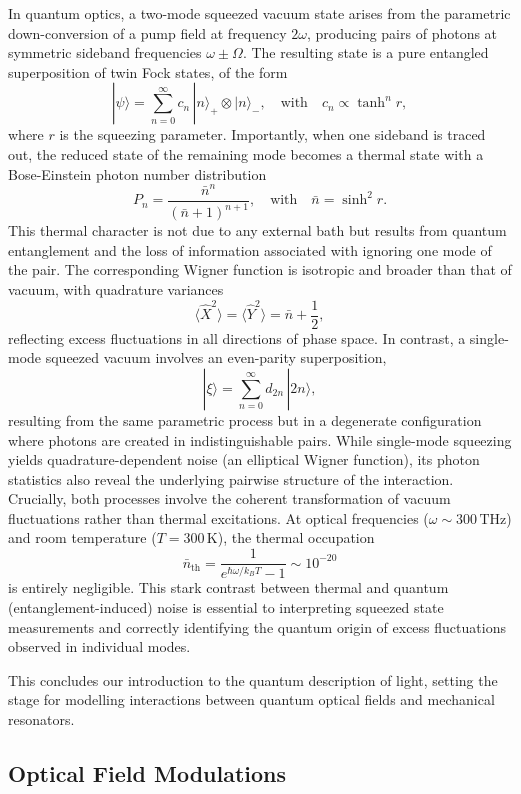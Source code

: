 In quantum optics, a two-mode squeezed vacuum state arises from the parametric down-conversion of a pump field at frequency \(2\omega\), producing pairs of photons at symmetric sideband frequencies \(\omega \pm \Omega\). The resulting state is a pure entangled superposition of twin Fock states, of the form
\[
|\psi\rangle = \sum_{n=0}^{\infty} c_n\, |n\rangle_+ \otimes |n\rangle_- , \quad \text{with} \quad c_n \propto \tanh^n r,
\]
where \(r\) is the squeezing parameter. Importantly, when one sideband is traced out, the reduced state of the remaining mode becomes a thermal state with a Bose-Einstein photon number distribution
\[
P_n = \frac{\bar{n}^n}{(\bar{n} + 1)^{n+1}}, \quad \text{with} \quad \bar{n} = \sinh^2 r.
\]
This thermal character is not due to any external bath but results from quantum entanglement and the loss of information associated with ignoring one mode of the pair. The corresponding Wigner function is isotropic and broader than that of vacuum, with quadrature variances
\[
\langle \hat{X}^2 \rangle = \langle \hat{Y}^2 \rangle = \bar{n} + \frac{1}{2},
\]
reflecting excess fluctuations in all directions of phase space. In contrast, a single-mode squeezed vacuum involves an even-parity superposition,
\[
|\xi\rangle = \sum_{n=0}^{\infty} d_{2n}\, |2n\rangle,
\]
resulting from the same parametric process but in a degenerate configuration where photons are created in indistinguishable pairs. While single-mode squeezing yields quadrature-dependent noise (an elliptical Wigner function), its photon statistics also reveal the underlying pairwise structure of the interaction. Crucially, both processes involve the coherent transformation of vacuum fluctuations rather than thermal excitations. At optical frequencies (\(\omega \sim 300\,\mathrm{THz}\)) and room temperature (\(T = 300\,\mathrm{K}\)), the thermal occupation
\[
\bar{n}_{\text{th}} = \frac{1}{e^{\hbar \omega / k_B T} - 1} \sim 10^{-20}
\]
is entirely negligible. This stark contrast between thermal and quantum (entanglement-induced) noise is essential to interpreting squeezed state measurements and correctly identifying the quantum origin of excess fluctuations observed in individual modes.



\vspace{1em}
This concludes our introduction to the quantum description of light, setting the stage for modelling interactions between quantum optical fields and mechanical resonators.

\subsection{Optical Field Modulations}
